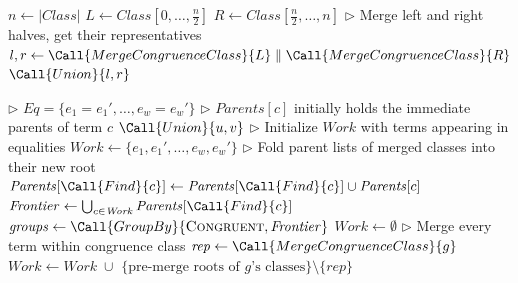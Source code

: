 \begin{algorithm}
\begin{algorithmic}[1]
      \State {}  \EndIf \State $n \gets |\textit{Class}|$ \State $L \gets
      \mathit{Class}[0,\ldots,\frac{n}{2}]$ \State $R \gets
      \mathit{Class}[\frac{n}{2},\ldots,n]$ \State $\rhd$ Merge left and right
      halves, get their representatives \State $l, r \gets
      \Call{MergeCongruenceClass}{L} \parallel \Call{MergeCongruenceClass}{R}$
      \State \Return $\Call{Union}{l, r}$  \EndFunction

        \State $\rhd$ $\mathit{Eq} = \{e_1 = e_1', \ldots, e_w = e_w'\}$
        \State $\rhd$ $\mathit{Parents}[c]$ initially holds the immediate parents of term $c$
          \State $\Call{Union}{u, v}$
        \EndParFor
        \State $\rhd$ Initialize $\mathit{Work}$ with terms appearing in equalities
        \State $\mathit{Work} \gets \{e_1, e_1', \ldots, e_w, e_w'\}$
          \State $\rhd$ Fold parent lists of merged classes into their new root
           
            \State $\mathit{Parents}[\Call{Find}{c}] \gets \mathit{Parents}[\Call{Find}{c}] \cup \mathit{Parents}[c]$
          \EndParFor
          \State $\mathit{Frontier} \gets \bigcup_{c \in \mathit{Work}} \mathit{Parents}[\Call{Find}{c}]$
          \State $\mathit{groups} \gets \Call{GroupBy}{\textsc{Congruent}, \mathit{Frontier}}$
          \State $\mathit{Work} \gets \emptyset$
            \State $\rhd$ Merge every term within congruence class
            \State $\mathit{rep} \gets \Call{MergeCongruenceClass}{g}$
            \State \mbox{$\mathit{Work} \gets \mathit{Work} \; \cup$}
            \Statex \hspace{\algorithmicindent}$\{\text{pre-merge roots of } g\text{'s classes}\}\setminus\{\mathit{rep}\}$
          \EndParFor
        \EndWhile
    \EndFunction
\end{algorithmic}
\caption{\parentalgo: parents-based bulk-synchronous algorithm}
\label{alg:bsp}
\end{algorithm}

